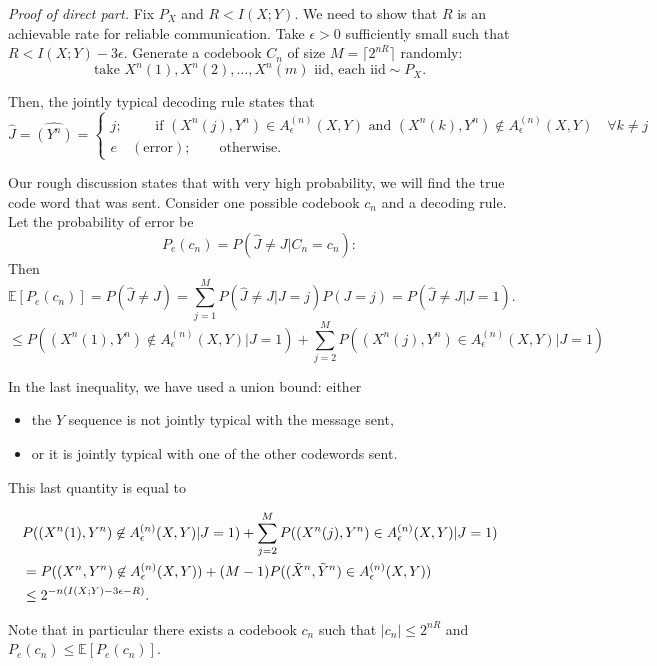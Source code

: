\documentclass[12pt]{extarticle}
\newcommand{\EE}{\mathbb{E}}
\newcommand{\eps}{\epsilon}
\newcommand{\T}{\text}
\begin{document}
{\it Proof of direct part.}  Fix $P_X$ and $R < I(X; Y)$.  We need to show that $R$ is an achievable rate for reliable communication.  Take $\eps > 0$ sufficiently small such that $R < I(X; Y) - 3 \epsilon$.  Generate a codebook $C_n$ of size $M = \lceil2^{nR} \rceil$ randomly:
\[
  \T{take } X^n(1), X^n(2), \dots, X^n(m) \T{ iid, each iid} \sim P_X.
\]

Then, the jointly typical decoding rule states that
\[
  \hat{J} = \hat{(Y^n)} =
  \begin{cases}
    j; \qquad \text{ if } (X^n(j), Y^n) \in A_{\eps}^{(n)} (X, Y) \text{ and } (X^{n}(k), Y^{n}) \not \in A_{\eps}^{(n)}(X, Y) \quad \forall k \neq j \\
    e \quad (\text{error}); \qquad \T{otherwise}.
    \end{cases}
\]

Our rough discussion states that with very high probability, we will find the true code word that was sent.  Consider one possible codebook $c_n$ and a decoding rule.  Let the probability of error be 
\[
  P_e(c_n)  = P(\hat{J} \neq J | C_n = c_n): 
\]
Then
\[
  \EE [P_e(c_n)] = P(\hat{J} \neq J) = \sum_{j=1}^{M} P(\hat{J} \neq J | J = j) P(J = j) = P(\hat{J} \neq J | J = 1).
\]
\[
\leq P((X^n (1), Y^n) \not \in A_{\eps}^{(n)} (X, Y) | J = 1) + \sum_{j=2}^{M} P((X^n(j), Y^n) \in A_{\eps}^{(n)} (X, Y) | J = 1)
\]

In the last inequality, we have used a union bound: either 

\begin{itemize}
  \item  the $Y$ sequence is not jointly typical with the message sent, 
  \item or it is jointly typical with one of the other codewords sent.
\end{itemize}

This last quantity is equal to

\begin{align*}
  &  P((X^n (1), Y^n) \not \in A_{\eps}^{(n)} (X, Y) | J = 1) + \sum_{j=2}^{M} P((X^n(j), Y^n) \in A_{\eps}^{(n)} (X, Y) | J = 1) \\
    &= P ( (X^n, Y^n) \not \in A_{\eps}^{(n)} (X, Y)) + (M-1)P ((\Xt^n, \Yt^n) \in A_{\eps}^{(n)} (X, Y)) \\
    & \leq 2^{-n (I(X; Y) - 3 \eps - R)}.
\end{align*}

Note that in particular there exists a codebook $c_n$ such that $|c_n| \leq 2^{nR}$ and $P_e(c_n) \leq \EE [P_e(c_n)]$.
\end{document}
